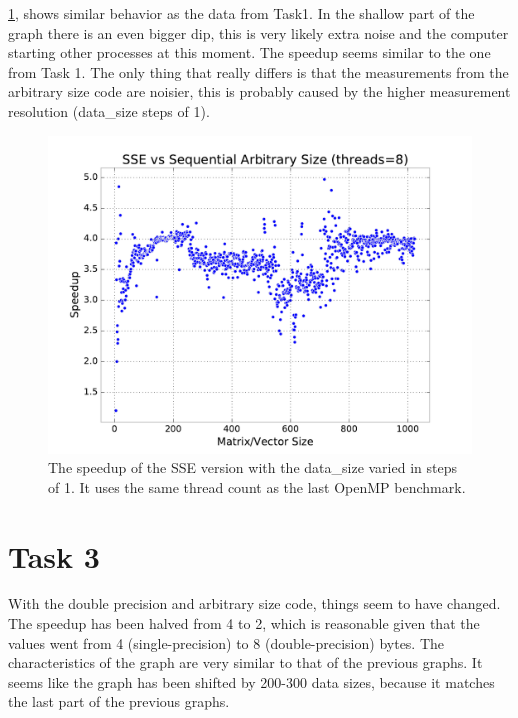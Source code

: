 \documentclass[final]{report}
\begin{document}
\cref{fig:sse-data-size-sweep-arbitrary}, shows similar behavior as the data from Task1.
In the shallow part of the graph there is an even bigger dip, this is very likely extra noise and the computer starting other processes at this moment.
The speedup seems similar to the one from Task 1.
The only thing that really differs is that the measurements from the arbitrary size code are noisier, this is probably caused by the higher measurement resolution (data\_size steps of 1).

\begin{figure}[H]
\centering
    \includegraphics[width=\linewidth]{resources/sse-data-size-sweep-arbitrary.pdf}
    \caption{The speedup of the SSE version with the data\_size varied in steps of 1. It uses the same thread count as the last OpenMP benchmark.}
    \label{fig:sse-data-size-sweep-arbitrary}
\end{figure}

\section{Task 3}
With the double precision and arbitrary size code, things seem to have changed.
The speedup has been halved from 4 to 2, which is reasonable given that the values went from 4 (single-precision) to 8 (double-precision) bytes.
The characteristics of the graph are very similar to that of the previous graphs.
It seems like the graph has been shifted by 200-300 data sizes, because it matches the last part of the previous graphs.
\end{document}
